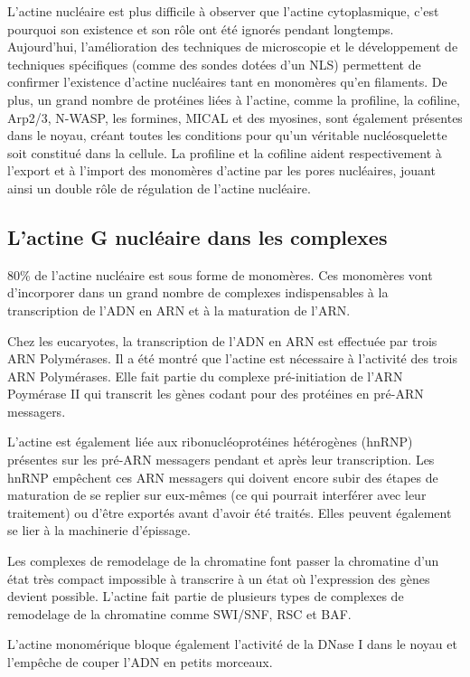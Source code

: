 L'actine nucléaire est plus difficile à observer que l'actine cytoplasmique, c'est pourquoi son existence et son rôle ont été ignorés pendant longtemps. 
Aujourd'hui, l'amélioration des techniques de microscopie et le développement de techniques spécifiques (comme des sondes dotées d'un NLS) permettent de confirmer l'existence d'actine nucléaires tant en monomères qu'en filaments. 
De plus, un grand nombre de protéines liées à l'actine, comme la profiline, la cofiline, Arp2/3, N-WASP, les formines, MICAL et des myosines, sont également présentes dans le noyau, créant toutes les conditions pour qu'un véritable nucléosquelette soit constitué dans la cellule. 
La profiline et la cofiline aident respectivement à l'export et à l'import des monomères d'actine par les pores nucléaires, jouant ainsi un double rôle de régulation de l'actine nucléaire. 


\subsection{L'actine G nucléaire dans les complexes}

80\% de l'actine nucléaire est sous forme de monomères. Ces monomères vont d'incorporer dans un grand nombre de complexes indispensables à la transcription de l'ADN en ARN et à la maturation de l'ARN. 

Chez les eucaryotes, la transcription de l'ADN en ARN est effectuée par trois ARN Polymérases. Il a été montré que l'actine est nécessaire à l'activité des trois ARN Polymérases. Elle fait partie du complexe pré-initiation de l'ARN Poymérase II qui transcrit les gènes codant pour des protéines en pré-ARN messagers.

L'actine est également liée aux ribonucléoprotéines hétérogènes (hnRNP) présentes sur les pré-ARN messagers pendant et après leur transcription. Les hnRNP empêchent ces ARN messagers qui doivent encore subir des étapes de maturation de se replier sur eux-mêmes (ce qui pourrait interférer avec leur traitement) ou d'être exportés avant d'avoir été traités. Elles peuvent également se lier à la machinerie d'épissage. 

Les complexes de remodelage de la chromatine font passer la chromatine d'un état très compact impossible à transcrire à un état où l'expression des gènes devient possible. L'actine fait partie de plusieurs types de complexes de remodelage de la chromatine comme SWI/SNF, RSC et BAF. 

L'actine monomérique bloque également l'activité de la DNase I dans le noyau et l'empêche de couper l'ADN en petits morceaux. 


